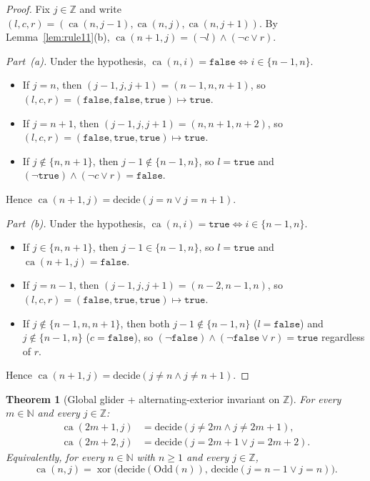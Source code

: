 \documentclass[11pt]{article}
\newtheorem{theorem}{Theorem}[section]
\theoremstyle{definition}
\newcommand{\N}{\mathbb{N}}
\newcommand{\Z}{\mathbb{Z}}
\newcommand{\ca}{\operatorname{ca}}
\begin{document}
\begin{proof}
Fix $j \in \Z$ and write $(l, c, r) = (\ca(n, j - 1), \ca(n, j), \ca(n, j + 1))$. By Lemma~\ref{lem:rule11}(b), $\ca(n + 1, j) = (\neg l) \land (\neg c \lor r)$.

\emph{Part~(a).} Under the hypothesis, $\ca(n, i) = \mathtt{false} \iff i \in \{n - 1, n\}$.
\begin{itemize}
\item If $j = n$, then $(j - 1, j, j + 1) = (n - 1, n, n + 1)$, so $(l, c, r) = (\mathtt{false}, \mathtt{false}, \mathtt{true}) \mapsto \mathtt{true}$.
\item If $j = n + 1$, then $(j - 1, j, j + 1) = (n, n + 1, n + 2)$, so $(l, c, r) = (\mathtt{false}, \mathtt{true}, \mathtt{true}) \mapsto \mathtt{true}$.
\item If $j \notin \{n, n + 1\}$, then $j - 1 \notin \{n - 1, n\}$, so $l = \mathtt{true}$ and $(\neg \mathtt{true}) \land (\neg c \lor r) = \mathtt{false}$.
\end{itemize}
Hence $\ca(n + 1, j) = \mathrm{decide}(j = n \lor j = n + 1)$.

\emph{Part~(b).} Under the hypothesis, $\ca(n, i) = \mathtt{true} \iff i \in \{n - 1, n\}$.
\begin{itemize}
\item If $j \in \{n, n + 1\}$, then $j - 1 \in \{n - 1, n\}$, so $l = \mathtt{true}$ and $\ca(n + 1, j) = \mathtt{false}$.
\item If $j = n - 1$, then $(j - 1, j, j + 1) = (n - 2, n - 1, n)$, so $(l, c, r) = (\mathtt{false}, \mathtt{true}, \mathtt{true}) \mapsto \mathtt{true}$.
\item If $j \notin \{n - 1, n, n + 1\}$, then both $j - 1 \notin \{n - 1, n\}$ ($l = \mathtt{false}$) and $j \notin \{n - 1, n\}$ ($c = \mathtt{false}$), so $(\neg \mathtt{false}) \land (\neg \mathtt{false} \lor r) = \mathtt{true}$ regardless of $r$.
\end{itemize}
Hence $\ca(n + 1, j) = \mathrm{decide}(j \ne n \land j \ne n + 1)$.
\end{proof}

\begin{theorem}[Global glider + alternating-exterior invariant on $\Z$]
\label{thm:global-inv}
For every $m \in \N$ and every $j \in \Z$:
\begin{align}
\ca(2m + 1, j) &= \mathrm{decide}(j \ne 2m \land j \ne 2m + 1), \label{eq:inv-odd}\\
\ca(2m + 2, j) &= \mathrm{decide}(j = 2m + 1 \lor j = 2m + 2). \label{eq:inv-even}
\end{align}
Equivalently, for every $n \in \N$ with $n \ge 1$ and every $j \in \Z$,
\begin{equation}
\label{eq:inv-xor}
\ca(n, j) = \operatorname{xor}\bigl(\mathrm{decide}(\mathrm{Odd}(n)),\, \mathrm{decide}(j = n - 1 \lor j = n)\bigr).
\end{equation}
\end{theorem}
\end{document}
